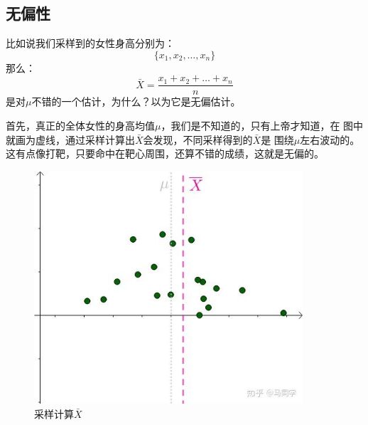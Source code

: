 \documentclass{article}
\begin{document}
\subsection{无偏性}
比如说我们采样到的女性身高分别为：
\begin{equation}
\{x_1,x_2,\dots,x_n\}
\end{equation}
那么：
\begin{equation}
\bar{X}=\frac{x_1+x_2+\dots+x_n}{n}
\end{equation}
是对$\mu$不错的一个估计，为什么？以为它是无偏估计。\par
首先，真正的全体女性的身高均值$\mu$，我们是不知道的，只有上帝才知道，在
图中就画为虚线，通过采样计算出$\bar{X}$会发现，不同采样得到的$\bar{X}$是
围绕$\mu$左右波动的。这有点像打靶，只要命中在靶心周围，还算不错的成绩，这就是无偏的。
\begin{figure}[!hbp]
    \centering
    \includegraphics[width=10cm]{figure2.jpg}
    \caption{采样计算$\bar{X}$}
\end{figure}
\end{document}
